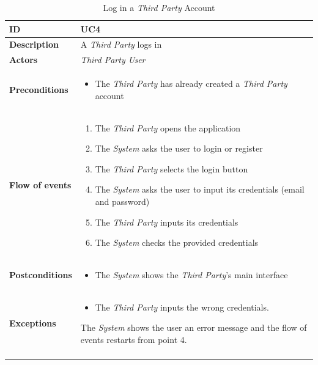\documentclass[titlepage]{article}
\begin{document}
\begin{longtable}{| p{3 cm} | p{10 cm} |} 
			\hline
			{\bf ID} & UC4 \\
			\hline
			{\bf Description} & A {\it Third Party} logs in\\
			\hline
			{\bf Actors} & {\it {\it Third Party} User} \\
			\hline
			{\bf Preconditions} & 		
							\begin{itemize}
								\item The {\it Third Party}  has already created a {\it Third Party} account 
							\end{itemize}
			\\
			\hline
			{\bf Flow of events} & 
							\begin{enumerate}
								\item The {\it Third Party} opens the application
								\item The {\it System} asks the user to login or register
								\item The {\it Third Party} selects the login button
								\item The {\it System} asks the user to input its credentials (email and password)
								\item The {\it Third Party} inputs its credentials
								\item The {\it System} checks the provided credentials

							\end{enumerate}
			
			 \\
			\hline
			{\bf Postconditions} & 
							\begin{itemize}
								\item The {\it System} shows the {\it Third Party}’s main interface
							\end{itemize}
			\\
			\hline
			{\bf Exceptions} & 
							\begin{itemize}
								\item The {\it Third Party} inputs the wrong credentials. 
							\end{itemize}
							The {\it System} shows the user an error message and the flow of events 							restarts from point 4.
							
			\\
			\hline
			\caption{Log in a {\it Third Party} Account}
			\end{longtable}
\end{document}

